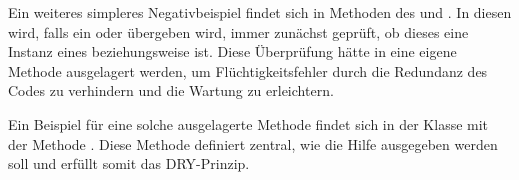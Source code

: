 Ein weiteres simpleres Negativbeispiel findet sich in Methoden des  und . In diesen wird, falls ein  oder  übergeben wird, immer zunächst geprüft, ob dieses eine Instanz eines  beziehungsweise  ist. Diese Überprüfung hätte in eine eigene Methode ausgelagert werden, um Flüchtigkeitsfehler durch die Redundanz des Codes zu verhindern und die Wartung zu erleichtern.

Ein Beispiel für eine solche ausgelagerte Methode findet sich in der Klasse  mit der Methode . Diese Methode definiert zentral, wie die Hilfe ausgegeben werden soll und erfüllt somit das DRY-Prinzip.